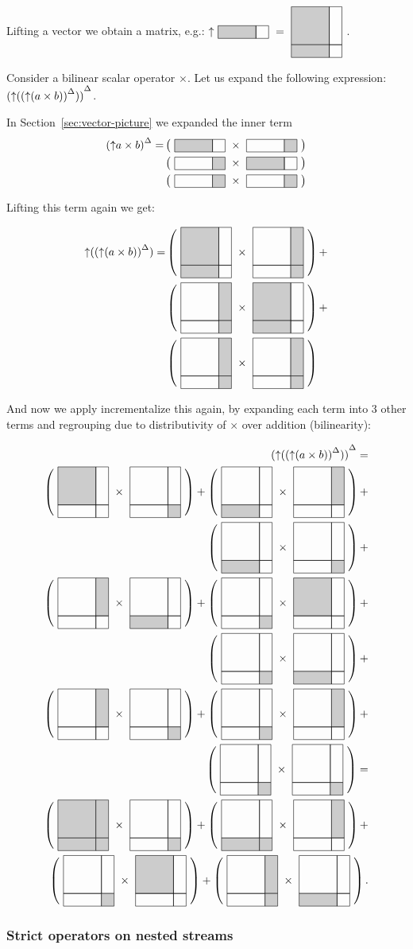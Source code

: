 Lifting a vector we obtain a matrix, e.g.:
$\lift{\strm{1 0}} = \mtrx{1 0 1 0}$. 

Consider a bilinear scalar operator $\times$.  Let us expand the following expression:
${({\uparrow}({({\uparrow}(a \times b))}^{\Delta}))}^{\Delta}$.

In Section~\ref{sec:vector-picture} we expanded the inner term
$$
\begin{aligned}
\inc{(\lift{a \times b})} = &\matmult{\strm{1 0}}{\strm{0 1}} \\ 
&\matmult{\strm{0 1}}{\strm{1 0}} \\
&\matmult{\strm{0 1}}{\strm{0 1}}
\end{aligned}
$$

Lifting this term again we get:

$$
\begin{aligned}
\lift{(\inc{(\lift{(a \times b)})})} =& 
\matmult{\mtrx{1 0 1 0}}{\mtrx{0 1 0 1}} +\\ 
&\matmult{\mtrx{0 1 0 1}}{\mtrx{1 0 1 0}} +\\
&\matmult{\mtrx{0 1 0 1}}{\mtrx{0 1 0 1}}
\end{aligned}
$$

And now we apply incrementalize this again, by expanding each
term into 3 other terms and regrouping due to distributivity of $\times$ over addition (bilinearity):

$$
\begin{aligned}
\inc{(\lift{(\inc{(\lift{(a \times b)})})})} = \\ 
%
\matmult{\mtrx{1 0 0 0}}{\mtrx{0 0 0 1}} + 
\matmult{\mtrx{0 0 1 0}}{\mtrx{0 1 0 0}} + \\
\matmult{\mtrx{0 0 1 0}}{\mtrx{0 0 0 1}} + \\ 
%
\matmult{\mtrx{0 1 0 0}}{\mtrx{0 0 1 0}} +
\matmult{\mtrx{0 0 0 1}}{\mtrx{1 0 0 0}} +\\
\matmult{\mtrx{0 0 0 1}}{\mtrx{0 0 1 0}} +\\
%
\matmult{\mtrx{0 1 0 0}}{\mtrx{0 0 0 1}} +
\matmult{\mtrx{0 0 0 1}}{\mtrx{0 1 0 0}} + \\
\matmult{\mtrx{0 0 0 1}}{\mtrx{0 0 0 1}} = \\
%
\matmult{\mtrx{1 1 1 1}}{\mtrx{0 0 0 1}} + 
\matmult{\mtrx{0 0 1 1}}{\mtrx{0 1 0 0}} + \\
\matmult{\mtrx{0 0 0 1}}{\mtrx{1 0 0 0}} + 
\matmult{\mtrx{0 1 0 1}}{\mtrx{0 0 1 9}}.
\end{aligned}
$$

\subsubsection{Strict operators on nested streams}

